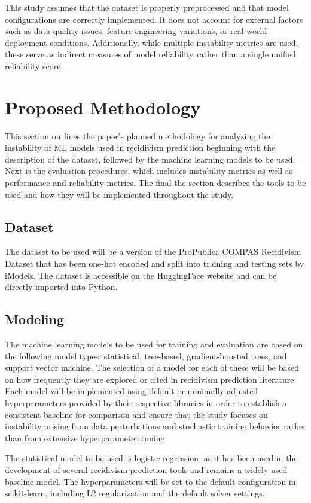 \documentclass[12pt]{article}
\begin{document}
This study assumes that the dataset is properly preprocessed and that model configurations are correctly implemented. It does not account for external factors such as data quality issues, feature engineering variations, or real-world deployment conditions. Additionally, while multiple instability metrics are used, these serve as indirect measures of model reliability rather than a single unified reliability score.

\section{Proposed Methodology}
This section outlines the paper's planned methodology for analyzing the instability of ML models used in recidivism prediction beginning with the description of the dataset, followed by the machine learning models to be used. Next is the evaluation procedures, which includes instability metrics as well as performance and reliability metrics. The final the section describes the tools to be used and how they will be implemented throughout the study. 

\subsection{Dataset} 
The dataset to be used will be a version of the ProPublica COMPAS Recidivism Dataset that has been one-hot encoded and split into training and testing sets by iModels. The dataset is accessible on the HuggingFace website and can be directly imported into Python.

\subsection{Modeling}
\tab%
The machine learning models to be used for training and evaluation are based on the following model types: statistical, tree-based, gradient-boosted trees, and support vector machine. The selection of a model for each of these will be based on how frequently they are explored or cited in recidivism prediction literature. Each model will be implemented using default or minimally adjusted hyperparameters provided by their respective libraries in order to establish a consistent baseline for comparison and ensure that the study focuses on instability arising from data perturbations and stochastic training behavior rather than from extensive hyperparameter tuning.

The statistical model to be used is logistic regression, as it has been used in the development of several recidivism prediction tools and remains a widely used baseline model. The hyperparameters will be set to the default configuration in scikit-learn, including L2 regularization and the default solver settings. 
\end{document}
